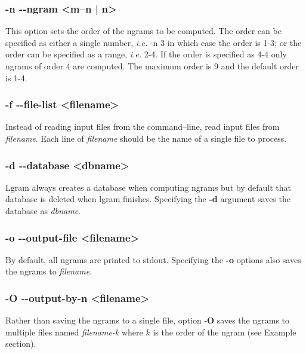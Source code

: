 \documentclass[12pt,a4paper]{report}
\newcommand{\optarg}[1]{\textless#1\textgreater}
\begin{document}
\subsubsection{-n -{}-ngram \optarg{m--n $\mid$ n}}
This option sets the order of the ngrams to be computed. The order can be specified as either a single number, \emph{i.e.} -n 3 in which case the order is 1-3; or the order can be specified as a range, \emph{i.e.} 2-4. If the order is specified as 4-4 only ngrams of order 4 are computed. The maximum order is 9 and the default order is 1-4. 

\subsubsection{-f -{}-file-list \optarg{filename}}
Instead of reading input files from the command--line, read input files from \emph{filename}. Each line of \emph{filename} should be the name of a single file to process.

\subsubsection{-d -{}-database  \optarg{dbname}} 
Lgram always creates a database when computing ngrams but by default that database is deleted when lgram finishes. Specifying the \textbf{-d} argument saves the database as \emph{dbname}.

\subsubsection{-o -{}-output-file \optarg{filename}}
By default, all ngrams are printed to stdout. Specifying the \textbf{-o} options also saves the ngrams to \emph{filename}.

\subsubsection{-O -{}-output-by-n \optarg{filename}} 
Rather than saving the ngrams to a single file, option $\textbf{-O}$ saves the ngrams to multiple files named \emph{filename-k} where $k$ is the order of the ngram (see Example section).
\end{document}
